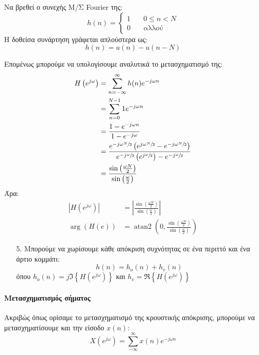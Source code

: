 \documentclass[11pt,a4paper,notitlepage,fleqn]{article}
\begin{document}
\begin{exercise}
	Να βρεθεί ο συνεχής Μ/Σ Fourier της:
	\[
	h(n) = \begin{cases}
	1 & \quad 0 \leq n < N\\
	0 & \quad \text{αλλού}
	\end{cases}
	\]
	\tcblower
	Η δοθείσα συνάρτηση γράφεται απλούστερα ως:
	\[
	h(n) = u(n) - u(n-N)
	\]
	
	Επομένως μπορούμε να υπολογίσουμε αναλυτικά το μετασχηματισμό της:
	\begin{align*}
		H\left(e^{j\omega }\right)
		&= \sum_{n=-\infty}^{\infty} h(n) e^{-j\omega n}
		\\ &= \sum_{n=0}^{N-1} 1 e^{-j\omega n}
		\\ &= \frac{1-e^{-j\omega n}}{1-e^{-j\omega }}
		\\ &= \frac
		{
			e^{-j\omega \sfrac{N}{2} } 
			\left(
				e^{j\omega \sfrac{N}{2} }-e^{-j\omega \sfrac{N}{2} }
			\right)
		}
		{ 
			e^{-j\sfrac{\omega }{2} }  
			\left( e^{j\sfrac{\omega }{2}  }\right)
			-e^{-j\sfrac{\omega }{2} 	}
		}
	\\ &= 	\frac{\sin\left(\frac{\omega N}{2}\right)}{\sin\left(\frac{\omega}{2}\right)}
	\end{align*}
	Άρα:
	\begin{align*}
		\left|H\left(e^{j\omega }\right)\right|
		 &= \left|
		\frac{\sin\left(\frac{\omega N}{2}\right)}{\sin\left(\frac{\omega}{2}\right)}
		\right|
		\\
		\arg\left(H\left(e\right)\right) &= \mathop{atan2}\left(0, \frac{\sin\left(\frac{\omega N}{2}\right)}{\sin\left(\frac{\omega}{2}\right)}\right)
	\end{align*}
\end{exercise}

\begin{enumerate}
	\item[5.]
	Μπορούμε να χωρίσουμε κάθε απόκριση συχνότητας σε ένα περιττό και ένα άρτιο κομμάτι:
	\[
	h(n) = h_o(n) + h_e(n)
	\]
	όπου \( h_o(n) = j\Im \left\lbrace H\left(e^{j\omega }\right)\right\rbrace \)
	και \( h_e = \Re\left\lbrace H\left(e^{j\omega }\right) \right\rbrace \)
\end{enumerate}

\paragraph{Μετασχηματισμός σήματος}
Ακριβώς όπως ορίσαμε το μετασχηματισμό της κρουστικής απόκρισης, μπορούμε να μετασχηματίσουμε
και την είσοδο \( x(n) \):
\[
X\left(e^{j\omega }\right) = \sum_{-\infty}^{\infty} x(n)e^{-j\omega n}
\]
\end{document}
